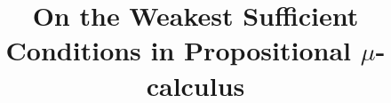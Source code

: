\documentclass[runningheads]{llncs}
\begin{document}
%
\title{On the Weakest Sufficient Conditions in Propositional $\mu$-calculus}

\newcommand{\tuple}[1]{{\langle{#1}\rangle}}
\newcommand{\Mod}{\textit{Mod}}
\newcommand\ie{{\it i.e. }}
\newcommand\eg{{\it e.g.}}
\newtheorem{examp}{Example}

\newcommand{\rto}{\rightarrow}
\newcommand{\lto}{\leftarrow}
\newcommand{\lrto}{\leftrightarrow}
\newcommand{\Rto}{\Rightarrow}
\newcommand{\Lto}{\Leftarrow}
\newcommand{\LRto}{\Leftrightarrow}
\newcommand{\Var}{\textit{Var}}
\newcommand{\Forget}{\textit{Forget}}
\newcommand{\KForget}{\textit{KForget}}
\newcommand{\TForget}{\textit{TForget}}
\newcommand{\forget}{\textit{forget}}
\newcommand{\Fst}{\textit{Fst}}
\newcommand{\dep}{\textit{dep}}
\newcommand{\term}{\textit{term}}
\newcommand{\literal}{\textit{literal}}

\newcommand{\Atom}{\mathcal{A}}
\newcommand{\SFive}{\textbf{S5}}
\newcommand{\MPK}{\textsc{k}}
\newcommand{\MPB}{\textsc{b}}
\newcommand{\MPT}{\textsc{t}}
\newcommand{\MPA}{\forall}
\newcommand{\MPE}{\exists}

\newcommand{\DNF}{\textit{DNF}}
\newcommand{\CNF}{\textit{CNF}}
\end{document}

